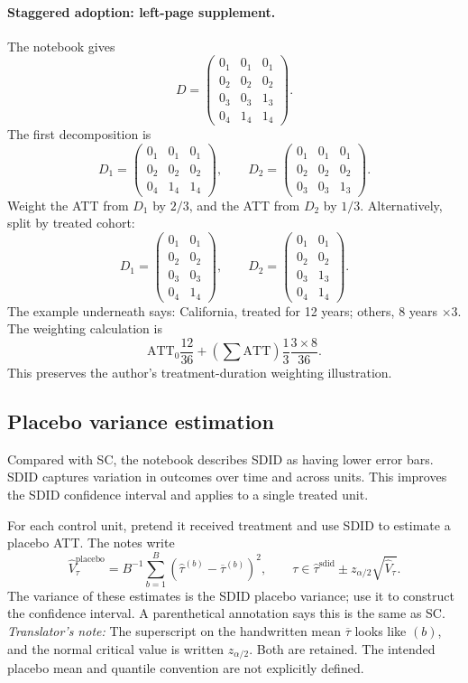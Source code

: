 \paragraph{Staggered adoption: left-page supplement.}
The notebook gives
\[
D=\begin{pmatrix}
0_1&0_1&0_1\\0_2&0_2&0_2\\0_3&0_3&1_3\\0_4&1_4&1_4
\end{pmatrix}.
\]
The first decomposition is
\[
D_1=\begin{pmatrix}0_1&0_1&0_1\\0_2&0_2&0_2\\0_4&1_4&1_4\end{pmatrix},
\qquad
D_2=\begin{pmatrix}0_1&0_1&0_1\\0_2&0_2&0_2\\0_3&0_3&1_3\end{pmatrix}.
\]
Weight the ATT from \(D_1\) by \(2/3\), and the ATT from \(D_2\) by \(1/3\). Alternatively, split by treated cohort:
\[
D_1=\begin{pmatrix}0_1&0_1\\0_2&0_2\\0_3&0_3\\0_4&1_4\end{pmatrix},
\qquad
D_2=\begin{pmatrix}0_1&0_1\\0_2&0_2\\0_3&1_3\\0_4&1_4\end{pmatrix}.
\]
The example underneath says: California, treated for 12 years; others, 8 years \(\times3\). The weighting calculation is
\[
\mathrm{ATT}_0\frac{12}{36}
+\left(\sum\mathrm{ATT}\right)\frac13\frac{3\times8}{36}.
\]
This preserves the author's treatment-duration weighting illustration.

\subsection{Placebo variance estimation}
Compared with SC, the notebook describes SDID as having lower error bars. SDID captures variation in outcomes over time and across units. This improves the SDID confidence interval and applies to a single treated unit.

For each control unit, pretend it received treatment and use SDID to estimate a placebo ATT. The notes write
\[
\widehat V_{\tau}^{\mathrm{placebo}}
=B^{-1}\sum_{b=1}^{B}
\left(\widehat\tau^{(b)}-\overline\tau^{(b)}\right)^2,
\qquad
\tau\in\widehat\tau^{\mathrm{sdid}}
\pm z_{\alpha/2}\sqrt{\widehat V_\tau}.
\]
The variance of these estimates is the SDID placebo variance; use it to construct the confidence interval. A parenthetical annotation says this is the same as SC.
\textit{Translator's note:} The superscript on the handwritten mean \(\overline\tau\) looks like \((b)\), and the normal critical value is written \(z_{\alpha/2}\). Both are retained. The intended placebo mean and quantile convention are not explicitly defined.

